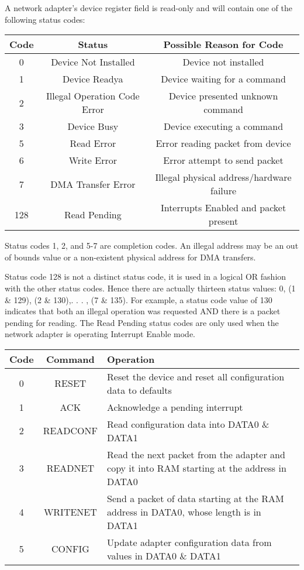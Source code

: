 A network adapter’s device register  field is read-only and will contain one of the following status codes:

\begin{center}
	\begin{tabular}{|c|c|c|}
		\hline
		Code & Status & Possible Reason for Code\\
		\hline
		\hline
		0 & Device Not Installed & Device not installed\\
		\hline
		1 & Device Readya & Device waiting for a command\\
		\hline
		2 & Illegal Operation Code Error & Device presented unknown command\\
		\hline
		3 & Device Busy & Device executing a command\\
		\hline
		5 & Read Error & Error reading packet from device\\
		\hline
		6 & Write Error & Error attempt to send packet\\
		\hline
		7 & DMA Transfer Error & Illegal physical address/hardware failure\\
		\hline
		128 & Read Pending & Interrupts Enabled and packet present\\
		\hline
	\end{tabular}
\end{center}

Status codes 1, 2, and 5-7 are completion codes. 
An illegal address may be an out of bounds value or a non-existent physical address for DMA transfers.

Status code 128 is not a distinct status code, it is used in a logical OR fashion with the other status codes. 
Hence there are actually thirteen status values: 0, (1 \& 129), (2 \& 130),. . . , (7 \& 135). 
For example, a status code value of 130 indicates that both an illegal operation was requested AND there is a packet pending for reading. 
The Read Pending status codes are only used when the network adapter is operating Interrupt Enable mode.

\begin{center}
	\begin{tabular}{|c|c|>{\centering\arraybackslash}p{11cm}|}
		\hline
		Code & Command & Operation\\
		\hline
		\hline
		0 & RESET & Reset the device and reset all configuration data to defaults\\
		\hline
		1 & ACK & Acknowledge a pending interrupt\\
		\hline
		2 & READCONF & Read configuration data into DATA0 \& DATA1\\
		\hline
		3 & READNET & Read the next packet from the adapter and copy it into RAM starting at the address in DATA0\\
		\hline
		4 & WRITENET & Send a packet of data starting at the RAM address in DATA0, whose length is in DATA1\\
		\hline
		5 & CONFIG & Update adapter configuration data from values in DATA0 \& DATA1\\
		\hline
	\end{tabular}
\end{center}

